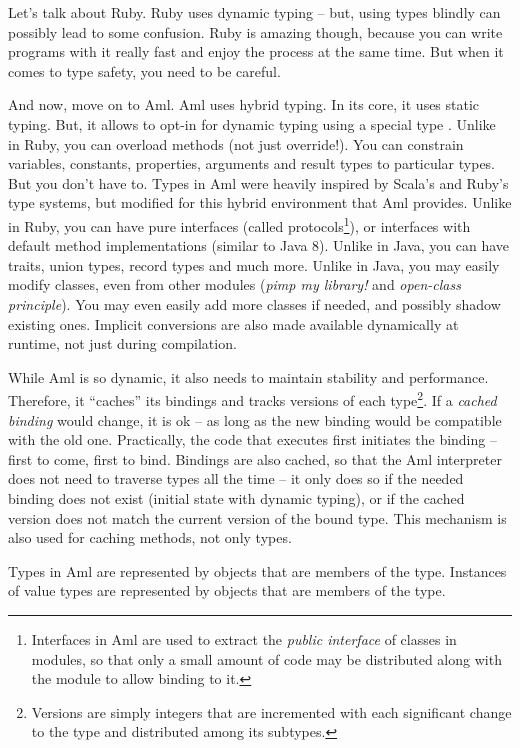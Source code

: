 Let's talk about Ruby. Ruby uses dynamic typing -- but, using types blindly can possibly lead to some confusion. Ruby is amazing though, because you can write programs with it really fast and enjoy the process at the same time. But when it comes to type safety, you need to be careful. 

And now, move on to Aml. Aml uses hybrid typing. In its core, it uses static typing. But, it allows to opt-in for dynamic typing using a special type . Unlike in Ruby, you can overload methods (not just override!). You can constrain variables, constants, properties, arguments and result types to particular types. But you don't have to. Types in Aml were heavily inspired by Scala's and Ruby's type systems, but modified for this hybrid environment that Aml provides. Unlike in Ruby, you can have pure interfaces (called protocols\footnote{Interfaces in Aml are used to extract the {\em public interface} of classes in modules, so that only a small amount of code may be distributed along with the module to allow binding to it.}), or interfaces with default method implementations (similar to Java 8). Unlike in Java, you can have traits, union types, record types and much more. Unlike in Java, you may easily modify classes, even from other modules ({\em pimp my library!} and {\em open-class principle}). You may even easily add more classes if needed, and possibly shadow existing ones. Implicit conversions are also made available dynamically at runtime, not just during compilation. 

While Aml is so dynamic, it also needs to maintain stability and performance. Therefore, it ``caches'' its bindings and tracks versions of each type\footnote{Versions are simply integers that are incremented with each significant change to the type and distributed among its subtypes.}. If a {\em cached binding} would change, it is ok -- as long as the new binding would be compatible with the old one. Practically, the code that executes first initiates the binding -- first to come, first to bind. Bindings are also cached, so that the Aml interpreter does not need to traverse types all the time -- it only does so if the needed binding does not exist (initial state with dynamic typing), or if the cached version does not match the current version of the bound type. This mechanism is also used for caching methods, not only types.

Types in Aml are represented by objects that are members of the  type. Instances of value types are represented by objects that are members of the  type. 






